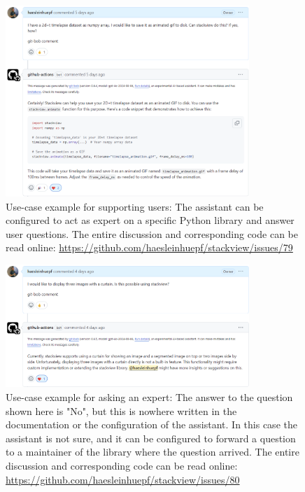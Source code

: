 \documentclass{ecai}
\begin{document}
\begin{figure}[h]
\centering
\includegraphics[width=0.82\textwidth]{example_supporting_users.png}
\caption{Use-case example for supporting users: The assistant can be configured to act as expert on a specific Python library and answer user questions. The entire discussion and corresponding code can be read online: \url{https://github.com/haesleinhuepf/stackview/issues/79}
\newline
\newline
}
\label{fig:examplesupportingusers}
\end{figure}


\begin{figure}[h]
\centering
\includegraphics[width=0.82\textwidth]{example_supporting_users2.png}
\caption{Use-case example for asking an expert: The answer to the question shown here is "No", but this is nowhere written in the documentation or the configuration of the assistant. In this case the assistant is not sure, and it can be configured to forward a question to a maintainer of the library where the question arrived. The entire discussion and corresponding code can be read online: \url{https://github.com/haesleinhuepf/stackview/issues/80}
\newline
\newline
}
\label{fig:examplesupportingusers2}
\end{figure}
\end{document}
